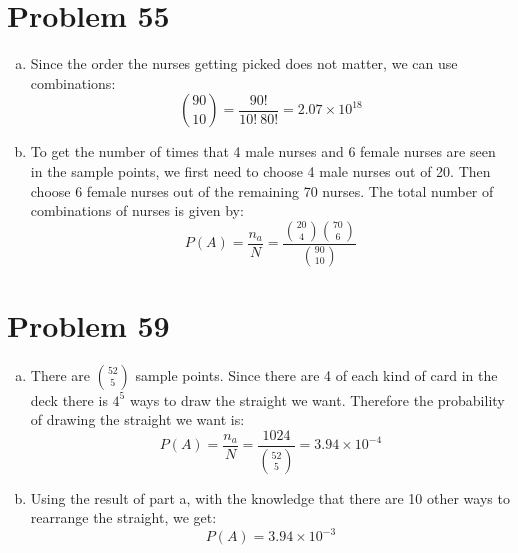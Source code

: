 \documentclass{article}
\begin{document}
\section*{Problem 55}
\begin{enumerate}[a)]
\item Since the order the nurses getting picked does not matter, we can use combinations: $${90 \choose 10} = \frac{90!}{10!\ 80!} = 2.07 \times 10^{18}$$
\item To get the number of times that 4 male nurses and 6 female nurses are seen in the sample points, we first need to choose 4 male nurses out of 20. Then choose 6 female nurses out of the remaining 70 nurses. The total number of combinations of nurses is given by:
  $$P(A) = \frac{n_a}{N} = \frac{{20 \choose 4}{70 \choose 6}}{{90 \choose 10}} $$
\end{enumerate}

\section*{Problem 59}
\begin{enumerate}[a)]
\item There are ${52 \choose 5}$ sample points. Since there are 4 of each kind of card in the deck there is $4^5$ ways to draw the straight we want. Therefore the probability of drawing the straight we want is:
  $$P(A) = \frac{n_a}{N} = \frac{1024}{{52 \choose 5}} = 3.94 \times 10^{-4}$$
\item Using the result of part a, with the knowledge that there are 10 other ways to rearrange the straight, we get:
  $$P(A) = 3.94 \times 10^{-3}$$
\end{enumerate}
\end{document}
